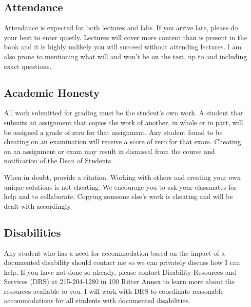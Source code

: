 \documentclass[10pt, letter]{article}
\begin{document}



\subsection*{Attendance}
Attendance is expected for both lectures and labs.  
If you arrive late, please do your best to enter quietly.  
Lectures will cover more content than is present in the book and it is highly unlikely you will succeed without attending lectures.
I am also prone to mentioning what will and won't be on the test, up to and including exact questions.



\subsection*{Academic Honesty}
All work submitted for grading must be the student's own work. A student that submits an assignment that copies the work of another, in whole or in part, will be assigned a grade of zero for that assignment. Any student found to be cheating on an examination will receive a score of zero for that exam. Cheating on an assignment or exam may result in dismissal from the course and notification of the Dean of Students.

When in doubt, provide a citation.
Working with others and creating your own unique solutions is not cheating.
We encourage you to ask your classmates for help and to collaborate.
Copying someone else's work is cheating and will be dealt with accordingly.


\subsection*{Disabilities}
Any student who has a need for accommodation based on the impact of a documented disability should contact me so we can privately discuss how I can help. 
If you have not done so already, please contact Disability Resources and Services (DRS) at 215-204-1280 in 100 Ritter Annex to learn more about the resources available to you.
I will work with DRS to coordinate reasonable accommodations for all students with documented disabilities.
\end{document}
